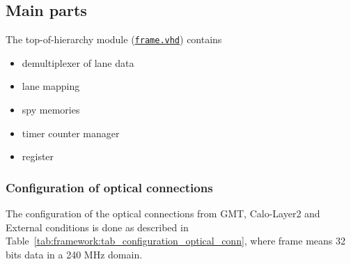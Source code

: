 \clearpage

\subsection{Main parts}

The top-of-hierarchy module (\href{\gitbranch/firmware/hdl/payload/frame.vhd}{\texttt{frame.vhd}}) contains
\begin {itemize}
\item demultiplexer of lane data
\item lane mapping
\item spy memories
\item timer counter manager
\item register
\end {itemize}

\subsubsection{Configuration of optical connections} \label{sec:framework:sec_configuration_optical_conn}
The configuration of the optical connections from GMT, Calo-Layer2 and External conditions is done as described in Table~\ref{tab:framework:tab_configuration_optical_conn}, where frame means 32 bits data in a 240 MHz domain.

